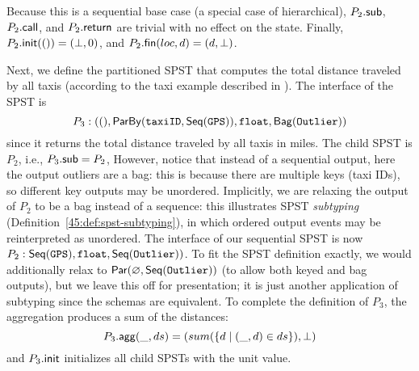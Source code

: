 Because this is a sequential base case
(a special case of hierarchical),
${P_2}.{\mathsf{sub}}$, ${P_2}.{\mathsf{call}}$, and ${P_2}.{\mathsf{return}}$
are trivial with no effect on the state.
Finally, ${P_2}.{\mathsf{init}}(()) = (\bot, 0)$,
and ${P_2}.{\mathsf{fin}}(loc, d) = (d, \bot)$.

Next, we define the partitioned SPST that computes the total distance traveled by all taxis (according to the taxi example described in ).
The interface of the SPST is
\[
P_3:
((),
    \mathsf{ParBy}({\texttt{taxiID}}, \mathsf{Seq}({ \texttt{GPS} })),
    \texttt{float},
    \mathsf{Bag}({\texttt{Outlier}}))
\]
since it returns the total distance traveled by all taxis in miles.
The child SPST is $P_2$, i.e., ${P_3}.{\mathsf{sub}} = P_2$,
However, notice that instead of a sequential output, here the output outliers
are a bag: this is because there are multiple keys (taxi IDs),
so different key outputs may be unordered.
Implicitly, we are relaxing the output of $P_2$ to be a bag instead of a sequence:
this illustrates SPST \emph{subtyping} (Definition~\ref{45:def:spst-subtyping}),
in which ordered output events may be reinterpreted as unordered.
The interface of our sequential SPST is now
$P_2: \mathsf{Seq}({ \texttt{GPS} }), \texttt{float}, \mathsf{Seq}({ \texttt{Outlier} }))$.
To fit the SPST definition exactly,
we would additionally relax to $\mathsf{Par}({\varnothing}, {\mathsf{Seq}({ \texttt{Outlier} })})$
(to allow both keyed and bag outputs),
but we leave this off for presentation;
it is just another application of subtyping since the schemas are equivalent.
To complete the definition of $P_3$,
the aggregation
produces a sum of the distances:
\[
{P_3}.{\mathsf{agg}}(\_, ds) = (sum( \{ d \mid (\_, d) \in ds \} ), \bot{})
\]
and ${P_3}.{\mathsf{init}}$ initializes all child SPSTs with the unit value.

